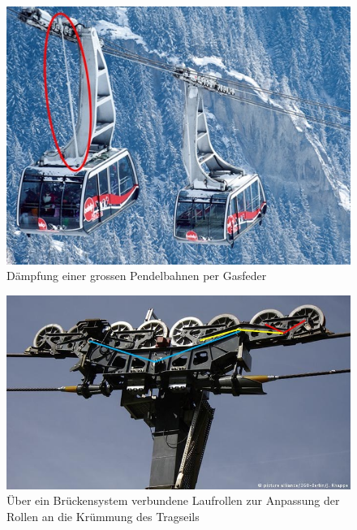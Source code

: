 \documentclass[a4paper,11pt]{scrartcl}
\begin{document}
\begin{figure}
    \includegraphics[width=\textwidth]{abbildung1.jpg}
    \caption{Dämpfung einer grossen Pendelbahnen per Gasfeder\protect\footnotemark}
    \label{fig:abb1}
\end{figure}

\begin{figure}
    \includegraphics[width=\textwidth]{abbildung2.jpg}
    \caption{Über ein Brückensystem verbundene Laufrollen zur Anpassung der Rollen an die Krümmung des Tragseils}
    \label{fig:abb2}
\end{figure}
\end{document}
